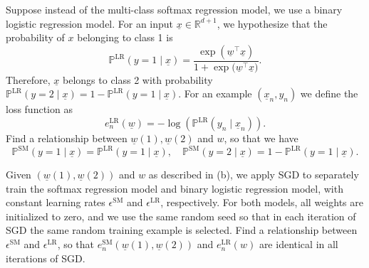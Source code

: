 \documentclass{article}
\newcommand{\probP}{\mathds{P}}
\theoremstyle{definition}
\begin{document}
\begin{question}[start=0]
\begin{question}
		\item Suppose instead of the multi-class softmax regression model, we use a binary logistic regression model. For an input $\underline{x} \in \mathbb{R}^{d+1}$, we hypothesize that the probability of $x$ belonging to class 1 is
		\[
		\probP^{\text{LR}}(y = 1\mid \underline{x}) = \frac{\exp({\underline{w}^\top \underline{x}})}{1 + \exp{(\underline{w}^\top \underline{x}})}.
		\]
		Therefore, $\underline{x}$ belongs to class 2 with probability $\probP^{\text{LR}}(y = 2\mid \underline{x}) = 1 - \probP^{\text{LR}}(y = 1\mid \underline{x})$. For an example $(\underline{x}_n, y_n)$ we define the loss function as
		\[
		e^{\text{LR}}_{n}(\underline{w}) = -\log(\probP^{\text{LR}}(y_n\mid \underline{x}_n)).
		\]
		Find a relationship between $\underline{w}(1), \underline{w}(2)$ and $w$, so that we have
		\[
		\probP^{\text{SM}}(y = 1\mid \underline{x}) = \probP^{\text{LR}}(y = 1\mid \underline{x}), \quad \probP^{\text{SM}}(y = 2\mid \underline{x}) = 1 - \probP^{\text{LR}}(y = 1\mid \underline{x}).
		\]
		
		\item Given $(\underline{w}(1), \underline{w}(2))$ and $w$ as described in (b), we apply SGD to separately train the softmax regression model and binary logistic regression model, with constant learning rates $\epsilon^{\text{SM}}$ and $\epsilon^{\text{LR}}$, respectively. For both models, all weights are initialized to zero, and we use the same random seed so that in each iteration of SGD the same random training example is selected. Find a relationship between $\epsilon^{\text{SM}}$ and $\epsilon^{\text{LR}}$, so that $e^{\text{SM}}_{n}(\underline{w}(1), \underline{w}(2))$ and $e^{\text{LR}}_{n}(w)$ are identical in all iterations of SGD.
	\end{question}
\end{question}
\end{document}
